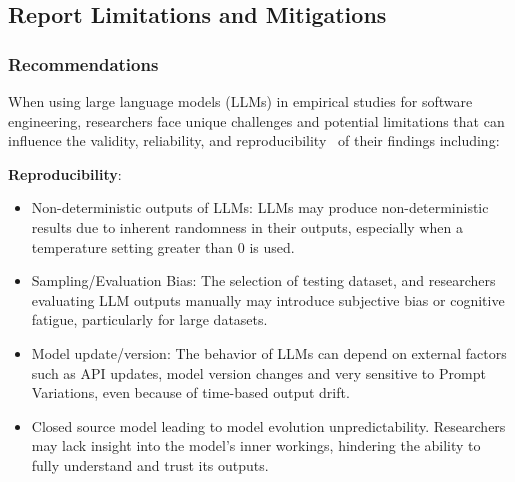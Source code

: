 



\subsection{Report Limitations and Mitigations}

\subsubsection{Recommendations}
When using large language models (LLMs) in empirical studies for software engineering, researchers face unique challenges and potential limitations that can influence the validity, reliability, and reproducibility~\cite{sallou2024breaking} of their findings including:

\textbf{Reproducibility}:
\begin{itemize}
  \item Non-deterministic outputs of LLMs: LLMs may produce non-deterministic results due to inherent randomness in their outputs, especially when a temperature setting greater than 0 is used.
  \item Sampling/Evaluation Bias: The selection of testing dataset, and researchers evaluating LLM outputs manually may introduce subjective bias or cognitive fatigue, particularly for large datasets.
  \item Model update/version:  The behavior of LLMs can depend on external factors such as API updates, model version changes and very sensitive to Prompt Variations, even because of time-based output drift.
  \item Closed source model leading to model evolution unpredictability. Researchers may lack insight into the model's inner workings, hindering the ability to fully understand and trust its outputs.
\end{itemize}

